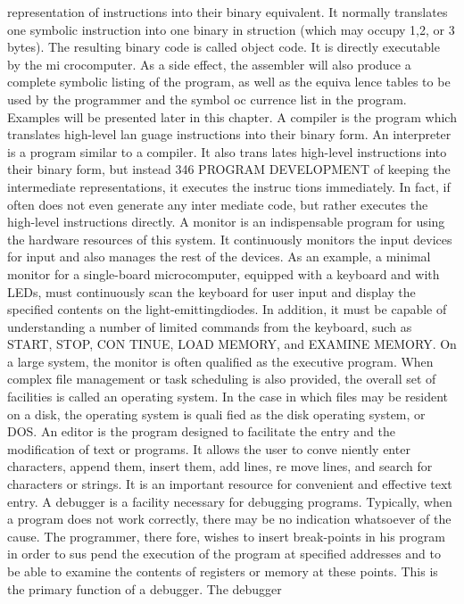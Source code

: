 {{{{{{{{{{{{{{{{{{{{{{{{{{{{{{{{{{{{{{{{{{{{{{{{{{{{{{{{{{{{{{{{{{{{{{{{{{{{{{{{{{{{{{{{{{{{{{{{{{{{{{{{{{{{{{{{{{{{{{{{{{{{{{{{{{{{{{{{{{{{representation of instructions into their binary equivalent. It
normally translates one symbolic instruction into one binary in
struction (which may occupy 1,2, or 3 bytes). The resulting binary
code is called object code. It is directly executable by the mi
crocomputer. As a side effect, the assembler will also produce a
complete symbolic listing of the program, as well as the equiva
lence tables to be used by the programmer and the symbol oc
currence list in the program. Examples will be presented later in
this chapter.
A compiler is the program which translates high-level lan
guage instructions into their binary form.
An interpreter is a program similar to a compiler. It also trans
lates high-level instructions into their binary form, but instead
346
PROGRAM DEVELOPMENT
of keeping the intermediate representations, it executes the instruc
tions immediately. In fact, if often does not even generate any inter
mediate code, but rather executes the high-level instructions directly.
A monitor is an indispensable program for using the hardware
resources of this system. It continuously monitors the input devices
for input and also manages the rest of the devices. As an example,
a minimal monitor for a single-board microcomputer, equipped with
a keyboard and with LEDs, must continuously scan the keyboard for
user input and display the specified contents on the light-emittingdiodes.
In addition, it must be capable of understanding a number of
limited commands from the keyboard, such as START, STOP, CON
TINUE, LOAD MEMORY, and EXAMINE MEMORY. On a large
system, the monitor is often qualified as the executive program. When
complex file management or task scheduling is also provided, the
overall set of facilities is called an operating system. In the case in
which files may be resident on a disk, the operating system is quali
fied as the disk operating system, or DOS.
An editor is the program designed to facilitate the entry and
the modification of text or programs. It allows the user to conve
niently enter characters, append them, insert them, add lines, re
move lines, and search for characters or strings. It is an important
resource for convenient and effective text entry.
A debugger is a facility necessary for debugging programs.
Typically, when a program does not work correctly, there may
be no indication whatsoever of the cause. The programmer, there
fore, wishes to insert break-points in his program in order to sus
pend the execution of the program at specified addresses and to
be able to examine the contents of registers or memory at these
points. This is the primary function of a debugger. The debugger
}}}}}}}}}}}}}}}}}}}}}}}}}}}}}}}}}}}}}}}}}}}}}}}}}}}}}}}}}}}}}}}}}}}}}}}}}}}}}}}}}}}}}}}}}}}}}}}}}}}}}}}}}}}}}}}}}}}}}}}}}}}}}}}}}}}}}}}}}}}}
